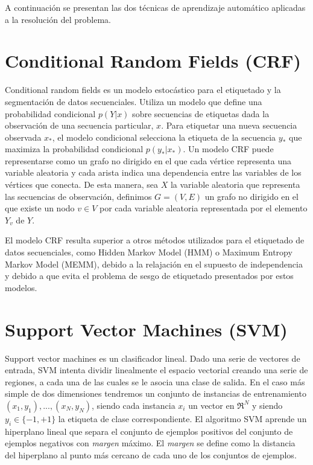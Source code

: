 \documentclass[runningheads,a4paper]{llncs}
\begin{document}
A continuación se presentan las dos técnicas de aprendizaje automático aplicadas a la resolución del problema.

\section{Conditional Random Fields (CRF)}
\label{sec:CRF}

Conditional random fields\cite{LAFFERTY01} es un modelo estocástico para el etiquetado y la segmentación de datos secuenciales. Utiliza un modelo que define una probabilidad condicional $p(Y|x)$ sobre secuencias de etiquetas dada la observación de una secuencia particular, $x$. Para etiquetar una nueva secuencia observada $x_*$, el modelo condicional selecciona la etiqueta de la secuencia $y_*$ que maximiza la probabilidad condicional $p(y_*|x_*)$. Un modelo CRF puede representarse como un grafo no dirigido en el que cada vértice representa una variable aleatoria y cada arista indica una dependencia entre las variables de los vértices que conecta. De esta manera, sea $X$ la variable aleatoria que representa las secuencias de observaci\'on, definimos $G=(V,E)$ un grafo no dirigido en el que existe un nodo $v \in V$ por cada variable aleatoria representada por el elemento $Y_v$ de $Y$. 

El modelo CRF resulta superior a otros métodos utilizados para el etiquetado de datos secuenciales, como Hidden Markov Model (HMM) o Maximum Entropy Markov Model (MEMM), debido a la relajación en el supuesto de independencia y debido a que evita el problema de sesgo de etiquetado presentados por estos modelos\cite{WALLACH04}.

\section{Support Vector Machines (SVM)}
\label{sec:SVM}

Support vector machines\cite{JOACHIMS99} es un clasificador lineal. Dado una serie de vectores de entrada, SVM intenta dividir linealmente el espacio vectorial creando una serie de regiones, a cada una de las cuales se le asocia una clase de salida. En el caso más simple de dos dimensiones tendremos un conjunto de instancias de entrenamiento ${(x_1, y_1),...,(x_N,y_N)}$, siendo cada instancia $x_i$ un vector en $\Re^N$ y siendo $y_i \in \lbrace-1,+1\rbrace$ la etiqueta de clase correspondiente. El algoritmo SVM aprende un hiperplano lineal que separa el conjunto de ejemplos positivos del conjunto de ejemplos negativos con \emph{margen} máximo. El \emph{margen} se define como la distancia del hiperplano al punto más cercano de cada uno de los conjuntos de ejemplos.
\end{document}

